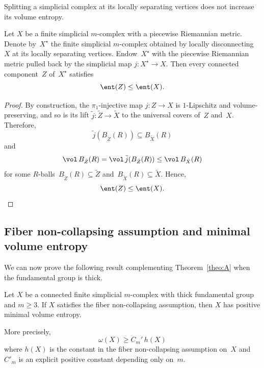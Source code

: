 Splitting a simplicial complex at its locally separating vertices does not increase its volume entropy.

\begin{lemma} \label{lem:star2}
Let $X$ be a finite simplicial $m$\nobreakdash-complex with a piecewise Riemannian metric.
Denote by~$X^\star$ the finite simplicial $m$\nobreakdash-complex obtained by locally disconnecting~$X$ at its locally separating vertices.
Endow~$X^\star$ with the piecewise Riemannian metric pulled back by the simplicial map $j:X^\star \to X$.
Then every connected component~$Z$ of~$X^\star$ satisfies
\[
\ent(Z) \leq \ent(X).
\]
\end{lemma}

\begin{proof}
By construction, the $\pi_1$-injective map $j:Z \to X$ is $1$-Lipschitz and volume-preserving, and so is its lift $\tilde{j}: \tilde{Z} \to \tilde{X}$ to the universal covers of~$Z$ and~$X$.
Therefore,
\[
\tilde{j}(B_{\tilde{Z}}(R)) \subseteq B_{\tilde{X}}(R)
\]
and
\[
\vol \, B_{\tilde{Z}}(R) = \vol \, \tilde{j}(B_{\tilde{Z}}(R)) \leq \vol \, B_{\tilde{X}}(R)
\]
for some $R$-balls~$B_{\tilde{Z}}(R) \subseteq \tilde{Z}$ and~$B_{\tilde{X}}(R) \subseteq \tilde{X}$.
Hence,
\[
\ent(Z) \leq \ent(X).\qedhere
\]
\end{proof}

\subsection{Fiber non-collapsing assumption and minimal volume entropy}

We can now prove the following result complementing Theorem~\ref{theo:A} when the fundamental group is thick.

\begin{theorem} \label{theo:B}
Let $X$ be a connected finite simplicial $m$\nobreakdash-complex with thick fundamental group and $m \geq 3$.
If $X$ satisfies the fiber non-collapsing assumption, then $X$ has positive minimal volume entropy.

More precisely,
\[
\omega(X) \geq C_m' \, h(X)
\]
where $h(X)$ is the constant in the fiber non-collapsing assumption on~$X$ and $C'_m$ is an explicit positive constant depending only on~$m$.
\end{theorem}

